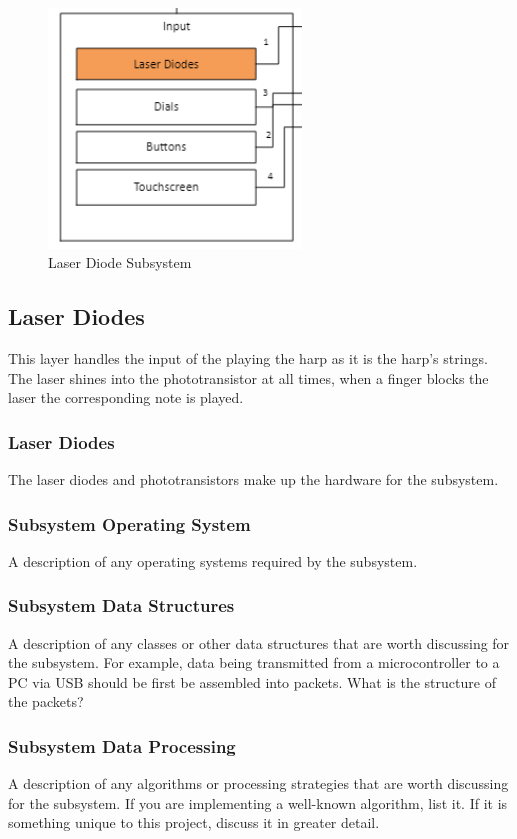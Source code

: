 \begin{figure}[h!]
	\centering
 	\includegraphics[width=0.60\textwidth]{images/Laserdiodes.png}
 \caption{Laser Diode Subsystem}
\end{figure}

\subsection{Laser Diodes}
This layer handles the input of the playing the harp as it is the harp's strings. The laser shines into the phototransistor at all times, when a finger blocks the laser the corresponding note is played. 


\subsubsection{Laser Diodes}
The laser diodes and phototransistors make up the hardware for the subsystem.

\subsubsection{Subsystem Operating System}
A description of any operating systems required by the subsystem.

\subsubsection{Subsystem Data Structures}
A description of any classes or other data structures that are worth discussing for the subsystem. For example, data being transmitted from a microcontroller to a PC via USB should be first be assembled into packets. What is the structure of the packets?

\subsubsection{Subsystem Data Processing}
A description of any algorithms or processing strategies that are worth discussing for the subsystem. If you are implementing a well-known algorithm, list it. If it is something unique to this project, discuss it in greater detail.


